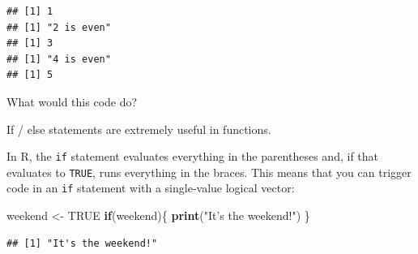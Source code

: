 \documentclass[]{book}
\makeatletter
\newenvironment{Shaded}{\begin{snugshade}}{\end{snugshade}}
\newcommand{\KeywordTok}[1]{\textcolor[rgb]{0.13,0.29,0.53}{\textbf{#1}}}
\newcommand{\DecValTok}[1]{\textcolor[rgb]{0.00,0.00,0.81}{#1}}
\newcommand{\StringTok}[1]{\textcolor[rgb]{0.31,0.60,0.02}{#1}}
\newcommand{\OtherTok}[1]{\textcolor[rgb]{0.56,0.35,0.01}{#1}}
\newcommand{\ControlFlowTok}[1]{\textcolor[rgb]{0.13,0.29,0.53}{\textbf{#1}}}
\newcommand{\OperatorTok}[1]{\textcolor[rgb]{0.81,0.36,0.00}{\textbf{#1}}}
\newcommand{\NormalTok}[1]{#1}
\newenvironment{kframe}{%
\medskip{}
\setlength{\fboxsep}{.8em}
 \def\at@end@of@kframe{}%
 \ifinner\ifhmode%
  \def\at@end@of@kframe{\end{minipage}}%
  \begin{minipage}{\columnwidth}%
 \fi\fi%
 \def\FrameCommand##1{\hskip\@totalleftmargin \hskip-\fboxsep
 \colorbox{shadecolor}{##1}\hskip-\fboxsep
     \hskip-\linewidth \hskip-\@totalleftmargin \hskip\columnwidth}%
 \MakeFramed {\advance\hsize-\width
   \@totalleftmargin\z@ \linewidth\hsize
   \@setminipage}}%
 {\par\unskip\endMakeFramed%
 \at@end@of@kframe}
\renewenvironment{Shaded}{\begin{kframe}}{\end{kframe}}
\theoremstyle{definition}
\theoremstyle{definition}
\theoremstyle{definition}
\theoremstyle{remark}
\makeatother
\begin{document}
\begin{verbatim}
## [1] 1
## [1] "2 is even"
## [1] 3
## [1] "4 is even"
## [1] 5
\end{verbatim}

What would this code do? \bigskip 

\begin{Shaded}
\end{Shaded}

If / else statements are extremely useful in functions. \bigskip

In R, the \texttt{if} statement evaluates everything in the parentheses
and, if that evaluates to \texttt{TRUE}, runs everything in the braces.
This means that you can trigger code in an \texttt{if} statement with a
single-value logical vector:

\begin{Shaded}
\begin{Highlighting}[]
\NormalTok{weekend <-}\StringTok{ }\OtherTok{TRUE}
\ControlFlowTok{if}\NormalTok{(weekend)\{}
  \KeywordTok{print}\NormalTok{(}\StringTok{"It's the weekend!"}\NormalTok{)}
\NormalTok{\}}
\end{Highlighting}
\end{Shaded}

\begin{verbatim}
## [1] "It's the weekend!"
\end{verbatim}
\end{document}
